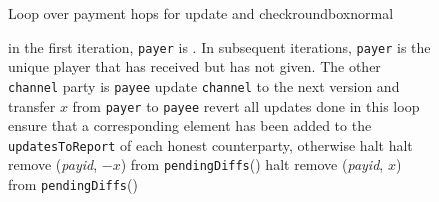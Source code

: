   \begin{figure}[H]
    \begin{titlebox}{\normalfont Loop over payment hops for update and
    check}{roundbox}{normal}
      \begin{algorithmic}[1]
        \label{alg:fpaynet:resolvepay:loops:update:loop}
          \State in the first iteration, \texttt{payer} is \dave. In
          subsequent iterations, \texttt{payer} is the unique player that
          has received but has not given. The other \texttt{channel} party
          is \texttt{payee}
            \State update \texttt{channel} to the next version and
            transfer $x$ from \texttt{payer} to \texttt{payee}
            \label{alg:fpaynet:resolvepay:loops:update:do}
          \Else
            \State revert all updates done in this loop
          \EndIf
        \EndFor
        \label{alg:fpaynet:resolvepay:loops:halt:loop}
          \State ensure that a corresponding element has been added to
          the \texttt{updatesToReport} of each honest counterparty,
          otherwise halt
          \label{alg:fpaynet:resolvepay:loops:halt:do}
        \EndFor
        \label{alg:fpaynet:resolvepay:loops:indiffs:debit:cond}
          \State halt
          \label{alg:fpaynet:resolvepay:loops:indiffs:debit:halt}
        \EndIf
        \State remove (\textit{payid}, $-x$) from \texttt{pendingDiffs}(\alice)
         
        \label{alg:fpaynet:resolvepay:loops:indiffs:credit:cond}
          \State halt
          \label{alg:fpaynet:resolvepay:loops:indiffs:credit:halt}
        \EndIf
        \State remove (\textit{payid}, $x$) from \texttt{pendingDiffs}(\bob)
      \end{algorithmic}
    \end{titlebox}
    \caption{}
    \label{alg:fpaynet:resolvepay:loops}
  \end{figure}

